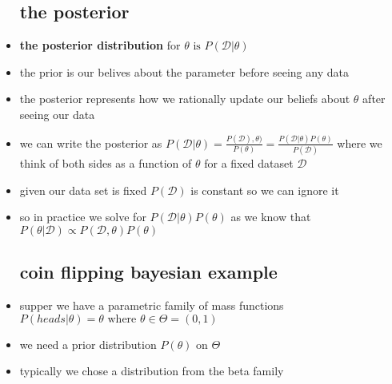 \documentclass{article}
\begin{document}
\begin{itemize}
\subsection*{the posterior}
\item \textbf{the posterior distribution} for $\theta \text{ is } P(\mathcal{D}|\theta)$
\item the prior is our belives about the parameter before seeing any data 
\item the posterior represents how we rationally update our beliefs about $\theta$ after seeing our data
\item we can write the posterior as $ P(\mathcal{D}|\theta)=\frac{P(\mathcal
D), \theta)}{P(\theta)}=\frac{P(\mathcal
D|\theta)P(\theta)}{P(\mathcal{D})}$ where we think of both sides as a function of $\theta$ for a fixed dataset $\mathcal{D}$
\item given our data set is fixed $P(\mathcal{D})$ is constant so we can ignore it 
\item so in practice we solve for $P(\mathcal{D}|\theta)P(\theta)$ as we know that $P(\theta|\mathcal{D})\propto P(\mathcal{D},\theta)P(\theta)$
\subsection*{coin flipping bayesian example}
\item supper we have a parametric family of mass functions $P(heads|\theta)=\theta\text{ where }\theta\in \Theta=(0,1)$
\item we need a prior distribution $P(\theta)$ on $\Theta$
\item typically we chose a distribution from the beta family

\end{itemize}
\end{document}
